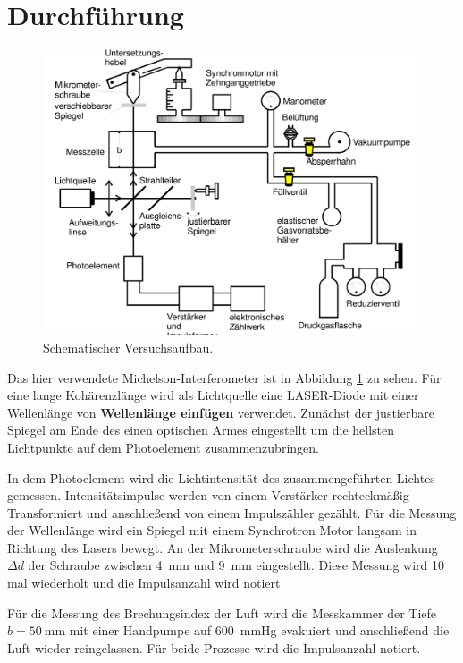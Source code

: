\section{Durchführung}
\begin{figure}
    \includegraphics[width=\textwidth]{Abbildungen/Screenshot (5).png}
    \caption{Schematischer Versuchsaufbau.}
    \label{fig:Aufbau}
\end{figure}
Das hier verwendete Michelson-Interferometer ist in Abbildung \ref{fig:Aufbau} zu sehen.
Für eine lange Kohärenzlänge wird als Lichtquelle eine LASER-Diode mit einer Wellenlänge von \textbf{Wellenlänge einfügen} verwendet. 
Zunächst der justierbare Spiegel am Ende des einen optischen Armes eingestellt um die hellsten Lichtpunkte auf dem Photoelement zusammenzubringen.

In dem Photoelement wird die Lichtintensität des zusammengeführten Lichtes gemessen.
Intensitätsimpulse werden von einem Verstärker rechteckmäßig Transformiert und anschließend von einem Impulszähler gezählt.
Für die Messung der Wellenlänge wird ein Spiegel mit einem Synchrotron Motor langsam in Richtung des Lasers bewegt.
An der Mikrometerschraube wird die Auslenkung $\Delta d$ der Schraube zwischen \qty{4}{\mm} und \qty{9}{\mm} eingestellt.
Diese Messung wird 10 mal wiederholt und die Impulsanzahl wird notiert

Für die Messung des Brechungsindex der Luft wird die Messkammer der Tiefe $b = \qty{50}{\mm}$ mit einer Handpumpe auf \qty{600}{\mmHg} evakuiert 
und anschließend die Luft wieder reingelassen. Für beide Prozesse wird die Impulsanzahl notiert.